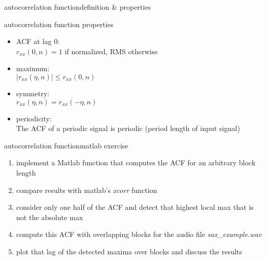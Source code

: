         \begin{frame}{autocorrelation function}{definition \& properties}
            \begin{block}{autocorrelation function properties}
                \begin{itemize}
                    \item	{ACF} at lag $0$:\\
                    $r_{xx}(0,n) = 1$ if normalized, RMS otherwise
                
                    \item	maximum:\\
                    $|r_{xx}(\eta,n)| \leq r_{xx}(0,n)$ 
                    \item	symmetry:\\
                    $r_{xx}(\eta,n) = r_{xx}(-\eta,n)$
                    \item	periodicity:\\
                    The {ACF} of a periodic signal is periodic (period length of input signal)
                \end{itemize}	
            \end{block}
        \end{frame}	
        \begin{frame}{autocorrelation function}{matlab exercise}
            
            \begin{enumerate}
                \item   implement a Matlab function that computes the ACF for an arbitrary block length
                \item   compare results with matlab's \textsl{xcorr} function
                \item   consider only one half of the ACF and detect that highest local max that is not the absolute max
                \item   compute this ACF with overlapping blocks for the audio file \textsl{sax\_example.wav} 
                \item   plot that lag of the detected maxima over blocks and discuss the results
            \end{enumerate}
        \end{frame}
            
